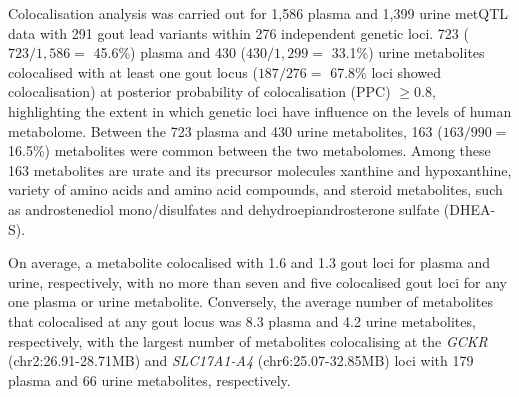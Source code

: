 \documentclass[a4paper,10pt]{article}
\begin{document}
\noindent
Colocalisation analysis was carried out for 1,586 plasma and 1,399 urine metQTL data with 291 gout lead variants within 276 independent genetic loci.
723 ($723 / 1,586 =$ 45.6\%) plasma and 430 ($430 / 1,299 =$ 33.1\%) urine metabolites colocalised with at least one gout locus ($187 / 276 =$ 67.8\% loci showed colocalisation) at posterior probability of colocalisation (PPC) $\ge 0.8$, highlighting the extent in which genetic loci have influence on the levels of human metabolome.
Between the 723 plasma and 430 urine metabolites, 163 ($163 / 990 =$ 16.5\%) metabolites were common between the two metabolomes.
Among these 163 metabolites are urate and its precursor molecules xanthine and hypoxanthine, variety of amino acids and amino acid compounds, and steroid metabolites, such as androstenediol mono/disulfates and dehydroepiandrosterone sulfate (DHEA-S).

On average, a metabolite colocalised with 1.6 and 1.3 gout loci for plasma and urine, respectively, with no more than seven and five colocalised gout loci for any one plasma or urine metabolite.
Conversely, the average number of metabolites that colocalised at any gout locus was 8.3 plasma and 4.2 urine metabolites, respectively, with the largest number of metabolites colocalising at the \textit{GCKR} (chr2:26.91-28.71MB) and \textit{SLC17A1-A4} (chr6:25.07-32.85MB) loci with 179 plasma and 66 urine metabolites, respectively.

\end{document}
